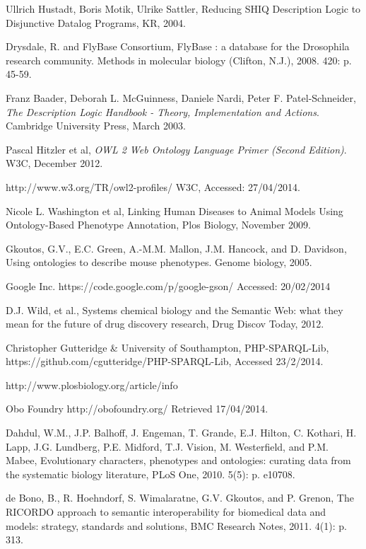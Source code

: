 \documentclass{article}
\begin{document}
\begin{thebibliography}{9}
  Ullrich Hustadt, Boris Motik, Ulrike Sattler,
  Reducing SHIQ Description Logic to Disjunctive Datalog Programs,
  KR,
  2004.

  Drysdale, R. and FlyBase Consortium, FlyBase : a database for the Drosophila research community.
  Methods in molecular biology (Clifton, N.J.), 2008. 420: p. 45-59.

 Franz Baader, Deborah L. McGuinness, Daniele Nardi, Peter F. Patel-Schneider,
 \emph{The Description Logic Handbook - Theory, Implementation and Actions}.
 Cambridge University Press,
 March 2003.

  Pascal Hitzler et al,
  \emph{OWL 2 Web Ontology Language Primer (Second Edition)}.
  W3C,
  December 2012.

  http://www.w3.org/TR/owl2-profiles/
  W3C,
  Accessed: 27/04/2014.

  Nicole L. Washington et al,
  Linking Human Diseases to Animal Models Using Ontology-Based Phenotype Annotation,
  Plos Biology,
  November 2009.

  Gkoutos, G.V., E.C. Green, A.-M.M. Mallon, J.M. Hancock, and D. Davidson,
  Using ontologies to describe mouse phenotypes. 
  Genome biology, 
  2005.

  Google Inc.
  https://code.google.com/p/google-gson/
  Accessed: 20/02/2014

  D.J. Wild, et al.,
  Systems chemical biology and the Semantic Web: what they mean for the future of drug discovery research,
  Drug Discov Today,
  2012.

  Christopher Gutteridge & University of Southampton,
  PHP-SPARQL-Lib,
  https://github.com/cgutteridge/PHP-SPARQL-Lib,
  Accessed 23/2/2014.

http://www.plosbiology.org/article/info%

  Obo Foundry
  http://obofoundry.org/
  Retrieved 17/04/2014.

  Dahdul, W.M., J.P. Balhoff, J. Engeman, T. Grande, E.J. Hilton, C. Kothari, H. Lapp, J.G. Lundberg, P.E. Midford, T.J. Vision, M. Westerfield, and P.M. Mabee, 
  Evolutionary characters, phenotypes and ontologies: curating data from the systematic biology literature,
  PLoS One,
  2010. 5(5): p. e10708.

  de Bono, B., R. Hoehndorf, S. Wimalaratne, G.V. Gkoutos, and P. Grenon, 
  The RICORDO approach to semantic interoperability for biomedical data and models: strategy, standards
and solutions, 
  BMC Research Notes, 
  2011. 4(1): p. 313.


\end{thebibliography}
\end{document}
